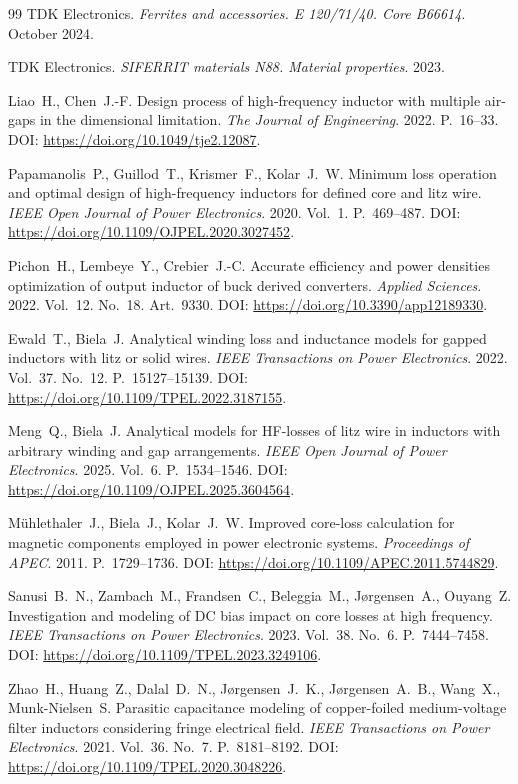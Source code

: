 \documentclass[14pt,a4paper]{extarticle}
\begin{document}
\begin{thebibliography}{99}
TDK Electronics.
\textit{Ferrites and accessories. E 120/71/40. Core B66614}.
October 2024.

TDK Electronics.
\textit{SIFERRIT materials N88. Material properties}.
2023.

Liao~H., Chen~J.-F.
Design process of high-frequency inductor with multiple air-gaps in the
dimensional limitation.
\textit{The Journal of Engineering}. 2022. P.~16--33.
DOI: \url{https://doi.org/10.1049/tje2.12087}.

Papamanolis~P., Guillod~T., Krismer~F., Kolar~J.~W.
Minimum loss operation and optimal design of high-frequency inductors for
defined core and litz wire.
\textit{IEEE Open Journal of Power Electronics}. 2020. Vol.~1.
P.~469--487.
DOI: \url{https://doi.org/10.1109/OJPEL.2020.3027452}.

Pichon~H., Lembeye~Y., Crebier~J.-C.
Accurate efficiency and power densities optimization of output inductor of
buck derived converters.
\textit{Applied Sciences}. 2022. Vol.~12. No.~18. Art.~9330.
DOI: \url{https://doi.org/10.3390/app12189330}.

Ewald~T., Biela~J.
Analytical winding loss and inductance models for gapped inductors with
litz or solid wires.
\textit{IEEE Transactions on Power Electronics}. 2022. Vol.~37. No.~12.
P.~15127--15139.
DOI: \url{https://doi.org/10.1109/TPEL.2022.3187155}.

Meng~Q., Biela~J.
Analytical models for HF-losses of litz wire in inductors with arbitrary
winding and gap arrangements.
\textit{IEEE Open Journal of Power Electronics}. 2025. Vol.~6.
P.~1534--1546.
DOI: \url{https://doi.org/10.1109/OJPEL.2025.3604564}.

Mühlethaler~J., Biela~J., Kolar~J.~W.
Improved core-loss calculation for magnetic components employed in power
electronic systems.
\textit{Proceedings of APEC}. 2011. P.~1729--1736.
DOI: \url{https://doi.org/10.1109/APEC.2011.5744829}.

Sanusi~B.~N., Zambach~M., Frandsen~C., Beleggia~M.,
J\o{}rgensen~A., Ouyang~Z.
Investigation and modeling of DC bias impact on core losses at high
frequency.
\textit{IEEE Transactions on Power Electronics}. 2023. Vol.~38. No.~6.
P.~7444--7458.
DOI: \url{https://doi.org/10.1109/TPEL.2023.3249106}.

Zhao~H., Huang~Z., Dalal~D.~N., J\o{}rgensen~J.~K.,
J\o{}rgensen~A.~B., Wang~X., Munk-Nielsen~S.
Parasitic capacitance modeling of copper-foiled medium-voltage filter
inductors considering fringe electrical field.
\textit{IEEE Transactions on Power Electronics}. 2021. Vol.~36. No.~7.
P.~8181--8192.
DOI: \url{https://doi.org/10.1109/TPEL.2020.3048226}.


\end{thebibliography}
\end{document}

